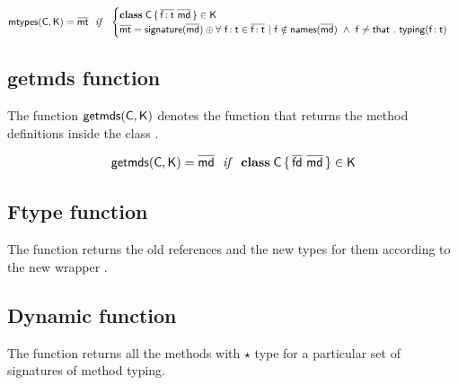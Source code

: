\documentclass[a4paper,USenglish]{tex/lipics-v2016}
\begin{document}
\begin{equation*}
\classoff\C\K = \b\mt ~~\mathit{if}~~ \begin{cases}

 \Class \C {\b{\Ftype\f\t}}{\b\md} \in \K\\
 \b\mt = \sign{\b\md} \oplus \forall ~\Ftype\f\t \in \b{\Ftype\f\t} ~|~ \f \notin \names{\b\md} ~\wedge~ \f\neq\that ~.~ \typez{\Ftype\f\t}

\end{cases}
\end{equation*}

\subsection{getmds function}

The function $\getmds\C\K$ denotes the function that returns the method definitions inside the class \C.

\begin{equation*}
\getmds\C\K = \b\md ~~\mathit{if}~~ \Class\C{\b{\fd}}{\b\md} \in \K
\end{equation*}

\subsection{Ftype function}

The function \ftypes\a\C\s\K returns the old references and the new types
for them according to the new wrapper \C.

\begin{mathpar}
\end{mathpar}


\subsection{Dynamic function}

The  function returns all the methods with $\star$ type for a particular set of 
signatures of method typing.

\begin{mathpar}



\end{mathpar}
\end{document}
